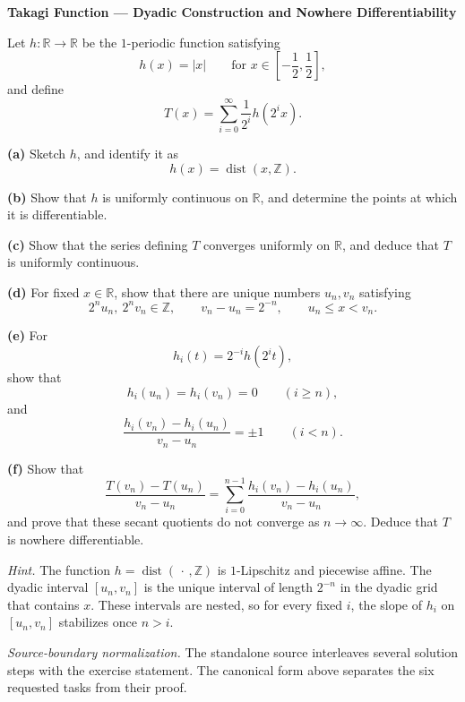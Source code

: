 \begin{problem}[CP-II-0454]
\label{prob:cp-ii-0454}
\textbf{Takagi Function --- Dyadic Construction and Nowhere Differentiability}

\hspace*{1.5em}Let \(h:\mathbb R\to\mathbb R\) be the \(1\)-periodic function satisfying
\[
h(x)=|x|
\qquad
\text{for }x\in\left[-\frac12,\frac12\right],
\]
and define
\[
T(x)
=
\sum_{i=0}^{\infty}
\frac1{2^i}h(2^i x).
\]

\par\smallskip\noindent\textbf{(a)}\quad
Sketch \(h\), and identify it as
\[
h(x)=\operatorname{dist}(x,\mathbb Z).
\]

\par\smallskip\noindent\textbf{(b)}\quad
Show that \(h\) is uniformly continuous on \(\mathbb R\), and determine
the points at which it is differentiable.

\par\smallskip\noindent\textbf{(c)}\quad
Show that the series defining \(T\) converges uniformly on \(\mathbb R\),
and deduce that \(T\) is uniformly continuous.

\par\smallskip\noindent\textbf{(d)}\quad
For fixed \(x\in\mathbb R\), show that there are unique numbers
\(u_n,v_n\) satisfying
\[
2^n u_n,\ 2^n v_n\in\mathbb Z,
\qquad
v_n-u_n=2^{-n},
\qquad
u_n\le x<v_n.
\]

\par\smallskip\noindent\textbf{(e)}\quad
For
\[
h_i(t)=2^{-i}h(2^i t),
\]
show that
\[
h_i(u_n)=h_i(v_n)=0
\qquad(i\ge n),
\]
and
\[
\frac{h_i(v_n)-h_i(u_n)}{v_n-u_n}
=
\pm1
\qquad(i<n).
\]

\par\smallskip\noindent\textbf{(f)}\quad
Show that
\[
\frac{T(v_n)-T(u_n)}{v_n-u_n}
=
\sum_{i=0}^{n-1}
\frac{h_i(v_n)-h_i(u_n)}{v_n-u_n},
\]
and prove that these secant quotients do not converge as \(n\to\infty\).
Deduce that \(T\) is nowhere differentiable.

\medskip
\noindent\emph{Hint.} The function \(h=\operatorname{dist}(\,\cdot\,,\mathbb Z)\) is
\(1\)-Lipschitz and piecewise affine. The dyadic interval
\([u_n,v_n]\) is the unique interval of length \(2^{-n}\) in the dyadic
grid that contains \(x\). These intervals are nested, so for every fixed
\(i\), the slope of \(h_i\) on \([u_n,v_n]\) stabilizes once \(n>i\).

\medskip
\noindent\textit{Source-boundary normalization.}
The standalone source interleaves several solution steps with the exercise statement.
The canonical form above separates the six requested tasks from their proof.
\end{problem}

